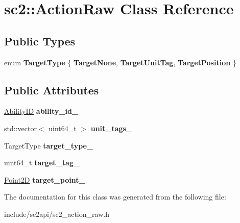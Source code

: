 \hypertarget{classsc2_1_1_action_raw}{}\section{sc2\+:\+:Action\+Raw Class Reference}
\label{classsc2_1_1_action_raw}
\subsection*{Public Types}
\begin{DoxyCompactItemize}
\item 
\mbox{\label{classsc2_1_1_action_raw_a18505ce7c00e382d636339eba391d800}} 
enum {\bfseries Target\+Type} \{ {\bfseries Target\+None}, 
{\bfseries Target\+Unit\+Tag}, 
{\bfseries Target\+Position}
 \}
\end{DoxyCompactItemize}
\subsection*{Public Attributes}
\begin{DoxyCompactItemize}
\item 
\mbox{\label{classsc2_1_1_action_raw_a4c79c80f2c54f1172806437505dccdf8}} 
\hyperlink{classsc2_1_1_s_c2_type}{Ability\+ID} {\bfseries ability\+\_\+id\+\_\+}
\item 
\mbox{\label{classsc2_1_1_action_raw_a8c3c9a164d9a663ded0553186cee2897}} 
std\+::vector$<$ uint64\+\_\+t $>$ {\bfseries unit\+\_\+tags\+\_\+}
\item 
\mbox{\label{classsc2_1_1_action_raw_ae4e821fcfe0f17d2bda3c9f8e98a8d1f}} 
Target\+Type {\bfseries target\+\_\+type\+\_\+}
\item 
\mbox{\label{classsc2_1_1_action_raw_a9e1d3b9acea7a5fecb1532ecf1d60bbc}} 
uint64\+\_\+t {\bfseries target\+\_\+tag\+\_\+}
\item 
\mbox{\label{classsc2_1_1_action_raw_a695b9e047ea978efefed29c825fbd9e9}} 
\hyperlink{structsc2_1_1_point2_d}{Point2D} {\bfseries target\+\_\+point\+\_\+}
\end{DoxyCompactItemize}


The documentation for this class was generated from the following file\+:\begin{DoxyCompactItemize}
\item 
include/sc2api/sc2\+\_\+action\+\_\+raw.\+h\end{DoxyCompactItemize}
